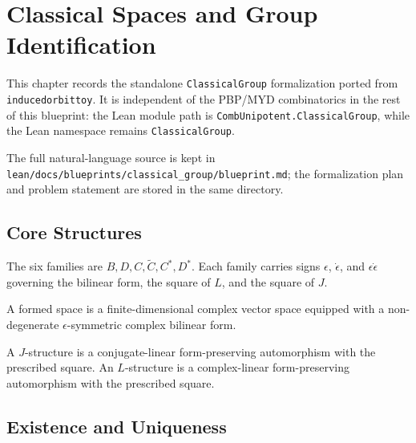 \chapter{Classical Spaces and Group Identification}
\label{chap:classical_group}

This chapter records the standalone \texttt{ClassicalGroup} formalization
ported from \texttt{inducedorbittoy}.  It is independent of the PBP/MYD
combinatorics in the rest of this blueprint: the Lean module path is
\texttt{CombUnipotent.ClassicalGroup}, while the Lean namespace remains
\texttt{ClassicalGroup}.

The full natural-language source is kept in
\texttt{lean/docs/blueprints/classical\_group/blueprint.md}; the formalization
plan and problem statement are stored in the same directory.

\section{Core Structures}

\begin{definition}
  \label{def:classical_star}
  \leanok
  The six families are \(B,D,C,\widetilde C,C^*,D^*\).  Each family carries
  signs \(\epsilon\), \(\dot\epsilon\), and \(\epsilon\dot\epsilon\) governing
  the bilinear form, the square of \(L\), and the square of \(J\).
\end{definition}

\begin{definition}
  \label{def:formed_space}
  \leanok
  A formed space is a finite-dimensional complex vector space equipped with a
  non-degenerate \(\epsilon\)-symmetric complex bilinear form.
\end{definition}

\begin{definition}
  \label{def:jl_structures}
  \leanok
  A \(J\)-structure is a conjugate-linear form-preserving automorphism with the
  prescribed square.  An \(L\)-structure is a complex-linear form-preserving
  automorphism with the prescribed square.
\end{definition}

\section{Existence and Uniqueness}

